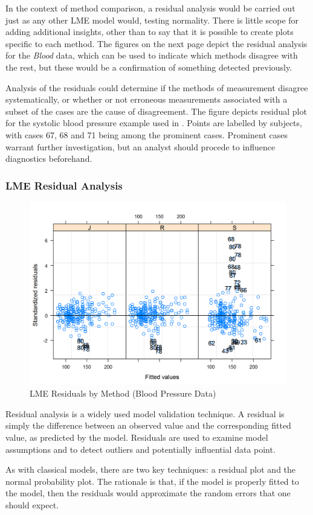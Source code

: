 \documentclass[12pt, a4paper]{report}
\theoremstyle{plain}
\theoremstyle{definition}
\theoremstyle{remark}
\begin{document}
In the context of method comparison, a residual analysis would be carried out just as any other LME model would, testing normality. There is little scope for adding additional insights, other than to say that it is possible to create plots specific to each method. The figures on the next page depict the residual analysis for the \textit{Blood} data, which can be used to indicate which methods disagree with the rest, but these would be a confirmation of something detected previously.

	
Analysis of the residuals could determine if the methods of measurement disagree systematically, or whether or not erroneous measurements associated with a subset of the cases are the cause of disagreement. 
The figure depicts residual plot for the systolic blood pressure example used in \citet{BA99}. Points are labelled by subjects, with cases 67, 68 and 71 being among the prominent cases. Prominent cases warrant further investigation, but an analyst should procede to influence diagnostics beforehand.

\subsubsection{LME Residual Analysis}
\begin{figure}[h!]
	\centering
	\includegraphics[width=0.7\linewidth]{images/bloodnlme-ResidPlot}
	\caption{LME Residuals by Method (Blood Pressure Data)}
\end{figure}



Residual analysis is a widely used model validation technique. A residual is simply the difference between an observed value and the corresponding fitted value, as predicted by the model.  Residuals are used to examine model assumptions and to detect outliers and potentially influential data point. 

As with classical models, there are two key techniques: a residual plot and the normal probability plot. The rationale is that, if the model is properly fitted to the model, then the residuals would approximate the random errors that one should expect.
\end{document}
